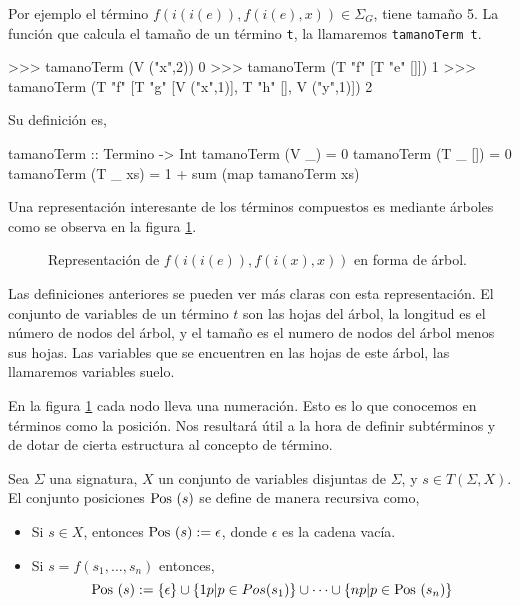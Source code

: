 Por ejemplo el término $f(i(i(e)),f(i(e),x)) \in \Sigma_G$, tiene
tamaño 5.  La función que calcula el tamaño de un término \texttt{t},
la llamaremos \texttt{tamanoTerm t}.

\begin{sesion}
>>> tamanoTerm (V ("x",2))
0
>>> tamanoTerm (T "f" [T "e" []])
1
>>> tamanoTerm (T "f" [T "g" [V ("x",1)], T "h" [], V ("y",1)])
2
\end{sesion}

Su definición es,

\begin{codigo}
tamanoTerm :: Termino -> Int
tamanoTerm (V _)    = 0
tamanoTerm (T _ []) = 0
tamanoTerm (T _ xs) = 1 + sum (map tamanoTerm xs)
\end{codigo}

Una representación interesante de los términos compuestos es mediante
árboles como se observa en la figura \ref{fig:termino}.

\begin{figure}[h]
  \label{fig:termino}
  \centering
  \caption{Representación de $f(i(i(e)),f(i(x),x))$ en forma de
    árbol.}
\end{figure}

Las definiciones anteriores se pueden ver más claras con esta
representación. El conjunto de variables de un término $t$ son las
hojas del árbol, la longitud es el número de nodos del árbol, y el
tamaño es el numero de nodos del árbol menos sus hojas. Las variables
que se encuentren en las hojas de este árbol, las llamaremos variables
suelo.

En la figura \ref{fig:termino} cada nodo lleva una numeración. Esto
es lo que conocemos en términos como la posición. Nos resultará útil a
la hora de definir subtérminos y de dotar de cierta estructura al
concepto de término.

\begin{defi}
  Sea $\Sigma$ una signatura, $X$ un conjunto de variables disjuntas
  de $\Sigma$, y $s \in T(\Sigma, X)$. El conjunto posiciones
  $\mbox{Pos } (s)$ se define de manera recursiva como,
\begin{itemize}

\item Si $s \in X$, entonces $\mbox{Pos }(s) := {\epsilon}$, donde $\epsilon$
  es la cadena vacía.
\item Si $s = f(s_1, \dots, s_n)$ entonces,
$$ \mbox{Pos }(s) := \{\epsilon\} \cup \{1p | p \in Pos(s_1) \} \cup \dots \cup \{np | p \in \mbox{Pos }(s_n) \}$$
\end{itemize}
\end{defi}

